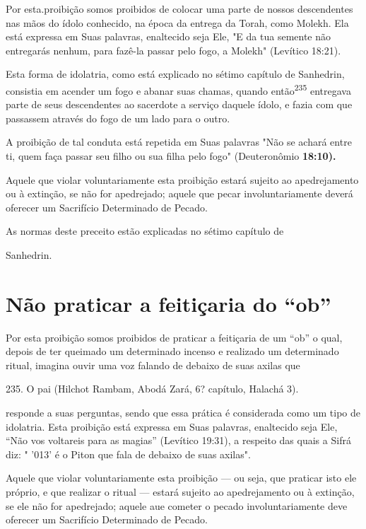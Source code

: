 Por esta.proibição somos proibidos de colocar uma parte de nossos
descendentes nas mãos do ídolo conhecido, na época da entrega da Torah,
co­mo Molekh. Ela está expressa em Suas palavras, enaltecido seja Ele,
"E da tua semente não entregarás nenhum, para fazê-la passar pelo fogo,
a Molekh" (Le­vítico 18:21).

Esta forma de idolatria, como está explicado no sétimo capítulo de
Sanhedrin, consistia em acender um fogo e abanar suas chamas, quando
então\textsuperscript{235} entregava parte de seus descendentes ao
sacerdote a serviço daquele ídolo, e fazia com que passassem através do
fogo de um lado para o outro.

A proibição de tal conduta está repetida em Suas palavras "Não se achará
entre ti, quem faça passar seu filho ou sua filha pelo fogo"
(Deuteronô­mio \textbf{18:10).}

Aquele que violar voluntariamente esta proibição estará sujeito ao
apedrejamento ou à extinção, se não for apedrejado; aquele que pecar
involun­tariamente deverá oferecer um Sacrifício Determinado de Pecado.

As normas deste preceito estão explicadas no sétimo capítulo de

Sanhedrin.

\section{Não praticar a feitiçaria do ``ob''}


Por esta proibição somos proibidos de praticar a feitiçaria de um ``ob'' o
qual, depois de ter queimado um determinado incenso e realizado um
deter­minado ritual, imagina ouvir uma voz falando de debaixo de suas
axilas que

235. O pai (Hilchot Rambam, Abodá Zará, 6? capítulo, Halachá 3).


responde a suas perguntas, sendo que essa prática é considerada como um
tipo de idolatria. Esta proibição está expressa em Suas palavras,
enaltecido seja Ele, ``Não vos voltareis para as magias'' (Levítico
19:31), a respeito das quais a Sifrá diz: " '013' é o Piton que fala de
debaixo de suas axilas".

Aquele que violar voluntariamente esta proibição --- ou seja, que
pra­ticar isto ele próprio, e que realizar o ritual --- estará sujeito
ao apedrejamento ou à extinção, se ele não for apedrejado; aquele aue
cometer o pecado invo­luntariamente deve oferecer um Sacrifício
Determinado de Pecado.


